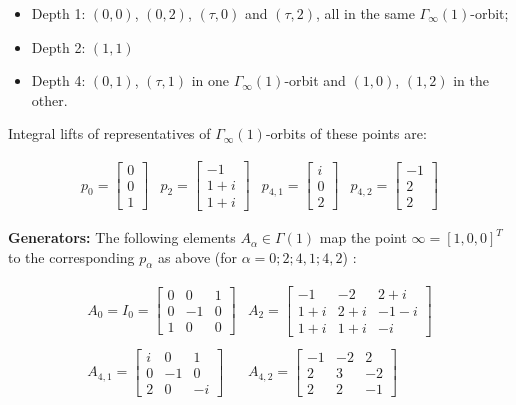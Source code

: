 \documentclass{article}[12pt]
\begin{document}
\begin{itemize}
\item Depth 1: $(0,0)$, $(0,2)$, $(\tau,0)$ and $(\tau,2)$, all in the same $\Gamma_\infty(1)$-orbit;
\item Depth 2: $(1,1)$
  \item Depth 4:   $(0,1)$, $(\tau,1)$ in one $\Gamma_\infty(1)$-orbit and $(1,0)$, $(1,2)$ in the other.
  \end{itemize}

Integral lifts of representatives of $\Gamma_\infty(1)$-orbits of these points are:

$$
\begin{array}{cccc} p_0=\left[ \begin{array}{c} 0 \\ 0 \\ 1 \end{array}\right] & 
  p_{2}=\left[ \begin{array}{c} -1 \\ 1+i \\ 1+i \end{array}\right] &
  p_{4,1}=\left[ \begin{array}{c} i \\ 0 \\ 2 \end{array}\right]  &
  p_{4,2}=\left[ \begin{array}{c} -1 \\ 2 \\ 2  \end{array}\right] 
  \end{array}
$$


{\bf Generators:}  The following elements $A_\alpha \in \Gamma(1)$ map the point $\infty=[1,0,0]^T$ to the corresponding $p_\alpha$ as above (for $\alpha=0; 2; 4,1; 4,2$) :

$$
\begin{array}{cc} A_0=I_0=\left[ \begin{array}{ccc} 0 & 0 & 1 \\ 0 & -1 & 0 \\ 1 & 0 & 0 \end{array}\right] & 
  A_{2}=\left[ \begin{array}{ccc} -1 & -2 & 2+i \\ 1+i & 2+i & -1-i \\ 1+i & 1+i & -i \end{array}\right] \\
  \\
  A_{4,1}=\left[ \begin{array}{ccc} i & 0 & 1 \\ 0 & -1 & 0 \\ 2 & 0 & -i \end{array}\right] & 
    A_{4,2}=\left[ \begin{array}{ccc} -1 & -2 & 2\\ 2 & 3 & -2 \\ 2 & 2 & -1  \end{array}\right] 
  \end{array}
$$
\end{document}
